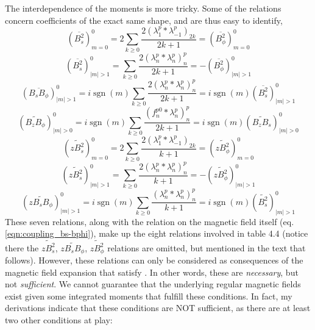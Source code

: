 \documentclass[a4paper, 11pt]{article}
\DeclareMathOperator{\sgn}{sgn}
\begin{document}
The interdependence of the moments is more tricky. Some of the relations concern coefficients of the exact same shape, and are thus easy to identify,
\begin{equation}\label{eqn:coupling_bss-bpp_m0}
    \left(\overline{B_s^2}\right)_{m=0}^{0} = 2 \sum_{k\geq 0} \frac{2 (\lambda_1^p * \lambda_{-1}^p)_{2k}}{2k+1} = \left(\overline{B_\phi^2}\right)_{m=0}^0
\end{equation}
\begin{equation}\label{eqn:coupling_bss-bpp_mg1}
    \left(\overline{B_s^2}\right)_{|m|>1}^{0} = \sum_{k\geq 0} \frac{2 \left(\lambda_n^p * \lambda_n^p\right)_{n}^{p}}{2k+1} = - \left(\overline{B_\phi^2}\right)_{|m|>1}^0
\end{equation}
\begin{equation}\label{eqn:coupling_bsp-bss_mg1}
    \left(\overline{B_sB_\phi}\right)_{|m|>1}^{0} = i\sgn(m)\sum_{k\geq 0} \frac{2 \left(\lambda_n^p * \lambda_n^p\right)_{n}^{p}}{2k+1} = i\sgn(m) \left(\overline{B_s^2}\right)_{|m|>1}^0
\end{equation}
\begin{equation}\label{eqn:coupling_bzp-bzs_mg0}
    \left(\widetilde{B_zB_\phi}\right)_{|m|>0}^{0} = i\sgn(m) \sum_{k\geq 0} \frac{ (f_n^{p0} * \lambda_n^p)_n^p}{2k+1} = i \sgn(m) \left(\widetilde{B_z B_s}\right)_{|m|>0}^0
\end{equation}
\begin{equation}\label{eqn:coupling_bzss-bzpp_m0}
    \left(\widetilde{zB_s^2}\right)_{m=0}^{0} = 2 \sum_{k\geq 0} \frac{2 (\lambda_1^p * \lambda_{-1}^p)_{2k}}{k+1} = \left(\widetilde{zB_\phi^2}\right)_{m=0}^0
\end{equation}
\begin{equation}\label{eqn:coupling_bzss-bzpp_mg1}
    \left(\widetilde{zB_s^2}\right)_{|m|>1}^{0} = \sum_{k\geq 0} \frac{2 \left(\lambda_n^p * \lambda_n^p\right)_{n}^{p}}{k+1} = - \left(\widetilde{zB_\phi^2}\right)_{|m|>1}^0
\end{equation}
\begin{equation}\label{eqn:coupling_bzsp-bss_mg1}
    \left(\widetilde{zB_sB_\phi}\right)_{|m|>1}^{0} = i\sgn(m)\sum_{k\geq 0} \frac{\left(\lambda_n^p * \lambda_n^p\right)_{n}^{p}}{k+1} = i\sgn(m) \left(\widetilde{B_s^2}\right)_{|m|>1}^0
\end{equation}
These seven relations, along with the relation on the magnetic field itself (eq.\ref{eqn:coupling_bs-bphi}), make up the eight relations involved in \textcite{holdenried-chernoff_long_2021} table 4.4 (notice there the $\widetilde{zB_s^2}$, $\widetilde{zB_sB_\phi}$, $\widetilde{zB_\phi^2}$ relations are omitted, but mentioned in the text that follows). However, these relations can only be considered as consequences of the magnetic field expansion that satisfy \textcite{lewis_physical_1990}. In other words, these are \textit{necessary}, but not \textit{sufficient}. We cannot guarantee that the underlying regular magnetic fields exist given some integrated moments that fulfill these conditions. In fact, my derivations indicate that these conditions are NOT sufficient, as there are at least two other conditions at play:
\end{document}
